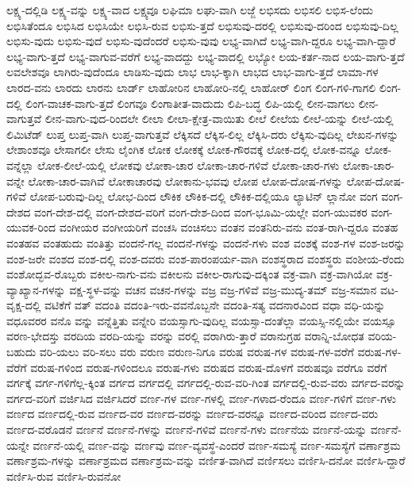 {ಲಕ್ಷ್ಯ-ದಲ್ಲಿಡಿ
ಲಕ್ಷ್ಯ-ವನ್ನು
ಲಕ್ಷ್ಯ-ವಾದ
ಲಕ್ಷ್ಯವೂ
ಲಘಿಮಾ
ಲಘು-ವಾಗಿ
ಲಜ್ಜೆ
ಲಭಿಸದು
ಲಭಿಸಲಿ
ಲಭಿಸ-ಲೆಂದು
ಲಭಿಸಿತೆಂದೂ
ಲಭಿಸಿದ
ಲಭಿಸಿಯೇ
ಲಭಿಸಿ-ರುವ
ಲಭಿಸು-ತ್ತದೆ
ಲಭಿಸುವು-ದರಲ್ಲಿ
ಲಭಿಸುವು-ದರಿಂದ
ಲಭಿಸುವು-ದಿಲ್ಲ
ಲಭಿಸು-ವುದು
ಲಭಿಸು-ವುದೆ
ಲಭಿಸು-ವುದೆಂದರೆ
ಲಭಿಸು-ವುವು
ಲಭ್ಯ-ವಾಗಿದೆ
ಲಭ್ಯ-ವಾಗಿ-ದ್ದರೂ
ಲಭ್ಯ-ವಾಗಿ-ದ್ದಾರೆ
ಲಭ್ಯ-ವಾಗು-ತ್ತದೆ
ಲಭ್ಯ-ವಾಗುವ-ವರೆಗೆ
ಲಭ್ಯ-ವಾದದ್ದು
ಲಭ್ಯ-ವಾದಲ್ಲಿ
ಲಭ್ಯೋ
ಲಯ-ಕರ್ತ-ನಾದ
ಲಯ-ವಾಗು-ತ್ತದೆ
ಲವಲೇಶವೂ
ಲಾಗಿರು-ವುದೆಂದೂ
ಲಾಡಿಸು-ವುದು
ಲಾಭ
ಲಾಭ-ಕ್ಕಾಗಿ
ಲಾಭದ
ಲಾಭ-ವಾಗು-ತ್ತದೆ
ಲಾಮಾ-ಗಳ
ಲಾರದ-ವನು
ಲಾರದು
ಲಾರನು
ಲಾರ್ಡ್
ಲಾಹೋರಿನ
ಲಾಹೋರಿ-ನಲ್ಲಿ
ಲಾಹೋರ್
ಲಿಂಗ
ಲಿಂಗ-ಗಳಿ-ಗಾಗಲಿ
ಲಿಂಗ-ದಲ್ಲಿ
ಲಿಂಗ-ವಾಚಕ-ವಾಗು-ತ್ತದೆ
ಲಿಂಗವೂ
ಲಿಂಗಾತೀತ-ವಾದುದು
ಲಿಪಿ-ಬದ್ಧ
ಲಿಪಿ-ಯಲ್ಲಿ
ಲೀನ-ವಾಗಲು
ಲೀನ-ವಾಗುತ್ತವೆ
ಲೀನ-ವಾಗು-ವುದ-ರಿಂದಲೇ
ಲೀಲಾ
ಲೀಲಾ-ಕ್ಷೇತ್ರ-ವಾಯಿತು
ಲೀಲೆ
ಲೀಲೆಯ
ಲೀಲೆ-ಯನ್ನು
ಲೀಲೆ-ಯಲ್ಲಿ
ಲಿಮಿಟೆಡ್
ಲುಪ್ತ
ಲುಪ್ತ-ವಾಗಿ
ಲುಪ್ತ-ವಾಗುತ್ತವೆ
ಲೆಕ್ಕಿಸದೆ
ಲೆಕ್ಕಿಸ-ಲಿಲ್ಲ
ಲೆಕ್ಕಿಸಿ-ದರು
ಲೆಕ್ಕಿಸು-ವುದಿಲ್ಲ
ಲೇಖನ-ಗಳನ್ನು
ಲೇಶಾಂಶವೂ
ಲೇಸಾಗಲೀ
ಲೇಸು
ಲೈಂಗಿಕ
ಲೋಕ
ಲೋಕಕ್ಕೆ
ಲೋಕ-ಗೌರವಕ್ಕೆ
ಲೋಕ-ದಲ್ಲಿ
ಲೋಕ-ವನ್ನೂ
ಲೋಕ-ವನ್ನೆಲ್ಲಾ
ಲೋಕ-ಲೀಲೆ-ಯಲ್ಲಿ
ಲೋಕವು
ಲೋಕಾ-ಚಾರ
ಲೋಕಾ-ಚಾರ-ಗಳಿವೆ
ಲೋಕಾ-ಚಾರ-ಗಳು
ಲೋಕಾ-ಚಾರ-ವನ್ನೇ
ಲೋಕಾ-ಚಾರ-ವಾಗಿವೆ
ಲೋಕಾಚಾರವು
ಲೋಕಾನು-ಭವವು
ಲೋಪ
ಲೋಪ-ದೋಷ-ಗಳನ್ನು
ಲೋಪ-ದೋಷ-ಗಳಿವೆ
ಲೋಪ-ಬರುವು-ದಿಲ್ಲ
ಲೋಭ-ದಿಂದ
ಲೌಕಿಕ
ಲೌಕಿಕ-ದಲ್ಲಿ
ಲೌಕಿಕ-ದಲ್ಲಿಯೂ
ಲ್ಯಾಟಿನ್
ಲ್ಲಾನೋ
ವಂಗ
ವಂಗ-ದೇಶದ
ವಂಗ-ದೇಶ-ದಲ್ಲಿ
ವಂಗ-ದೇಶದ-ವರಿಗೆ
ವಂಗ-ದೇಶ-ದಿಂದ
ವಂಗ-ಭೂಮಿ-ಯಲ್ಲೇ
ವಂಗ-ಯುವಕರ
ವಂಗ-ಯುವಕ-ರಿಂದ
ವಂಗೀಯರ
ವಂಗೀಯರಿಗೆ
ವಂಚಸಿ
ವಂಚಿಸಲು
ವಂತನ
ವಂತನಿರು-ವನು
ವಂತ-ರಾಗಿ-ದ್ದರೂ
ವಂತಹ
ವಂತಹವ
ವಂತಹುದು
ವಂತಿತ್ತು
ವಂದನೆ-ಗಲ್ಲ
ವಂದನೆ-ಗಳನ್ನು
ವಂದನೆ-ಗಳು
ವಂಶ
ವಂಶಕ್ಕೆ
ವಂಶ-ಗಳ
ವಂಶ-ಜರನ್ನು
ವಂಶ-ಜರೇ
ವಂಶದ
ವಂಶ-ದಲ್ಲಿ
ವಂಶ-ದವರು
ವಂಶ-ಪಾರಂಪರ್ಯ-ವಾಗಿ
ವಂಶಸ್ಥರಾದ
ವಂಶಸ್ಥರು
ವಂಶೀಯ-ರೆಂದು
ವಂಶೋದ್ಭವ-ರೊಬ್ಬರು
ವಕೀಲ-ನಾಗು-ವನು
ವಕೀಲನು
ವಕೀಲ-ರಾಗುವು-ದಕ್ಕಿಂತ
ವಕ್ರ-ವಾಗಿ
ವಕ್ರ-ವಾಗಿಯೋ
ವಕ್ರ-ವ್ಯಾಖ್ಯಾನ-ಗಳನ್ನು
ವಕ್ಷ-ಸ್ಥಳ-ವನ್ನು
ವಚನ
ವಚನ-ಗಳನ್ನು
ವಜ್ರ
ವಜ್ರ-ಗಳಿವೆ
ವಜ್ರ-ಮುದ್ಯ-ತಮ್
ವಜ್ರ-ಸಮಾನ
ವಟ-ವೃಕ್ಷ-ದಲ್ಲಿ
ವಟಿಕೆಗೆ
ವತ್
ವದಂತಿ
ವದಂತಿ-ಇರು-ವವನೊಬ್ಬನೇ
ವದಂತಿ-ಸತ್ಯ
ವದನಾರವಿಂದ
ವಧಾ
ವಧಿ-ಯನ್ನು
ವಧೂವರರ
ವನೊ
ವನ್ನು
ವನ್ನೆತ್ತಿತು
ವನ್ನೇರಿ
ವಯಸ್ಸಾಗು-ವುದಿಲ್ಲ
ವಯಸ್ಸಾ-ದಂತೆಲ್ಲಾ
ವಯಸ್ಸಿ-ನಲ್ಲಿಯೇ
ವಯಸ್ಸೂ
ವರಣ-ಭೇದಸ್ತು
ವರದಿಯ
ವರದಿ-ಯನ್ನು
ವರನ್ನು
ವರಲ್ಲಿ
ವರಾಗಿರು-ತ್ತಾರೆ
ವರಾನುಗ್ರಹ
ವರಾನ್ನಿ-ಬೋಧತ
ವರಿಯ-ಬಹುದು
ವರಿ-ಯಲು
ವರಿ-ಸಲು
ವರು
ವರುಣ
ವರುಣ-ನಿಗೂ
ವರುಷ
ವರುಷ-ಗಳ
ವರುಷ-ಗಳ-ವರೆಗೆ
ವರುಷ-ಗಳ-ವೆರೆಗೆ
ವರುಷ-ಗಳಿಂದ
ವರುಷ-ಗಳಿಂದಲೂ
ವರುಷ-ಗಳು
ವರುಷದ
ವರುಷ-ದೊಳಗೆ
ವರುಷವೂ
ವರೆಗೂ
ವರೆಗೆ
ವರ್ಗಕ್ಕೆ
ವರ್ಗ-ಗಳಿಗೆಲ್ಲ-ಕ್ಕಿಂತ
ವರ್ಗದ
ವರ್ಗದಲ್ಲಿ
ವರ್ಗದಲ್ಲಿ-ರುವ-ವರಿ-ಗಿಂತ
ವರ್ಗದಲ್ಲಿ-ರುವ-ವರು
ವರ್ಗದ-ವರನ್ನು
ವರ್ಗದ-ವರಿಗೆ
ವರ್ಜಿಸಿದ
ವರ್ಜಿಸಿದರೆ
ವರ್ಣ-ಗಳ
ವರ್ಣ-ಗಳಲ್ಲಿ
ವರ್ಣ-ಗಳಾದ-ರೆಂದೂ
ವರ್ಣ-ಗಳಿಗೆ
ವರ್ಣ-ಗಳು
ವರ್ಣದ
ವರ್ಣದಲ್ಲಿ-ರುವ
ವರ್ಣದ-ವರ
ವರ್ಣದ-ವರನ್ನು
ವರ್ಣದ-ವರನ್ನೂ
ವರ್ಣದ-ವರಿಂದ
ವರ್ಣದ-ವರು
ವರ್ಣದ-ವರೊಡನೆ
ವರ್ಣನೆ
ವರ್ಣನೆ-ಗಳನ್ನು
ವರ್ಣನೆ-ಗಳಿವೆ
ವರ್ಣನೆ-ಗಳು
ವರ್ಣನೆಯ
ವರ್ಣನೆ-ಯನ್ನು
ವರ್ಣನೆ-ಯನ್ನೇ
ವರ್ಣನೆ-ಯಲ್ಲಿ
ವರ್ಣ-ವನ್ನು
ವರ್ಣವು
ವರ್ಣ-ವ್ಯವಸ್ಥೆ-ಎಂದರೆ
ವರ್ಣ-ಸಮಸ್ಯೆ
ವರ್ಣ-ಸಮಸ್ಯೆಗೆ
ವರ್ಣಾಶ್ರಮ
ವರ್ಣಾಶ್ರಮ-ಗಳನ್ನು
ವರ್ಣಾಶ್ರಮದ
ವರ್ಣಾಶ್ರಮ-ವನ್ನು
ವರ್ಣಿತ-ವಾಗಿದೆ
ವರ್ಣಿಸಲು
ವರ್ಣಿಸಿ-ದನೋ
ವರ್ಣಿಸಿ-ದ್ದಾರೆ
ವರ್ಣಿಸಿ-ರುವ
ವರ್ಣಿಸಿ-ರುವನೋ
}
